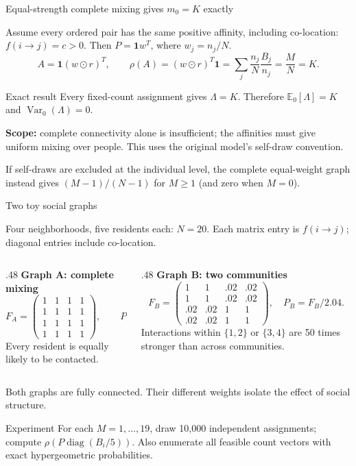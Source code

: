 \documentclass[aspectratio=169,10pt]{beamer}
\begin{document}
\begin{frame}{Equal-strength complete mixing gives $m_0=K$ exactly}
\small

Assume every ordered pair has the same positive affinity, including co-location:
$f(i\to j)=c>0$. Then $P=\mathbf1w^T$, where $w_j=n_j/N$.
\[
 A=\mathbf1(w\odot r)^T,\qquad
 \rho(A)=(w\odot r)^T\mathbf1
       =\sum_j\frac{n_j}{N}\frac{B_j}{n_j}
       =\frac MN=K.
\]
\begin{block}{Exact result}
Every fixed-count assignment gives $\Lambda=K$. Therefore
$\mathbb E_0[\Lambda]=K$ and $\operatorname{Var}_0(\Lambda)=0$.
\end{block}
\textbf{Scope:} complete connectivity alone is insufficient; the affinities must give uniform mixing over people. This uses the original model's self-draw convention.
\medskip

\footnotesize If self-draws are excluded at the individual level, the complete equal-weight graph instead gives $(M-1)/(N-1)$ for $M\geq1$ (and zero when $M=0$).

\end{frame}

\begin{frame}{Two toy social graphs}
\small

Four neighborhoods, five residents each: $N=20$. Each matrix entry is $f(i\to j)$; diagonal entries include co-location.
\begin{columns}[T]
\begin{column}{.48\textwidth}
\textbf{Graph A: complete mixing}
\[
 F_A=\begin{pmatrix}1&1&1&1\\1&1&1&1\\1&1&1&1\\1&1&1&1\end{pmatrix},\qquad P_A=F_A/4.
\]
Every resident is equally likely to be contacted.
\end{column}
\begin{column}{.48\textwidth}
\textbf{Graph B: two communities}
\[
 F_B=\begin{pmatrix}1&1&.02&.02\\1&1&.02&.02\\.02&.02&1&1\\.02&.02&1&1\end{pmatrix},\quad P_B=F_B/2.04.
\]
Interactions within $\{1,2\}$ or $\{3,4\}$ are 50 times stronger than across communities.
\end{column}
\end{columns}
\medskip
Both graphs are fully connected. Their different weights isolate the effect of social structure.
\begin{block}{Experiment}
For each $M=1,\ldots,19$, draw 10,000 independent assignments; compute $\rho(P\operatorname{diag}(B_i/5))$. Also enumerate all feasible count vectors with exact hypergeometric probabilities.
\end{block}

\end{frame}
\end{document}
